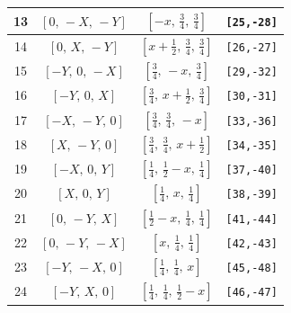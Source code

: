\documentclass[fleqn,8pt]{jsarticle}
\begin{document}
\begin{longtable}{cccc}
13 & $\left[ 0,\, - X,\, - Y \right]$ & $\left[ - x,\, \frac{3}{4},\, \frac{3}{4} \right]$ & {\tt [25,-28]} \\ \hline
14 & $\left[ 0,\, X,\, - Y \right]$ & $\left[ x + \frac{1}{2},\, \frac{3}{4},\, \frac{3}{4} \right]$ & {\tt [26,-27]} \\ \hline
15 & $\left[ - Y,\, 0,\, - X \right]$ & $\left[ \frac{3}{4},\, - x,\, \frac{3}{4} \right]$ & {\tt [29,-32]} \\ \hline
16 & $\left[ - Y,\, 0,\, X \right]$ & $\left[ \frac{3}{4},\, x + \frac{1}{2},\, \frac{3}{4} \right]$ & {\tt [30,-31]} \\ \hline
17 & $\left[ - X,\, - Y,\, 0 \right]$ & $\left[ \frac{3}{4},\, \frac{3}{4},\, - x \right]$ & {\tt [33,-36]} \\ \hline
18 & $\left[ X,\, - Y,\, 0 \right]$ & $\left[ \frac{3}{4},\, \frac{3}{4},\, x + \frac{1}{2} \right]$ & {\tt [34,-35]} \\ \hline
19 & $\left[ - X,\, 0,\, Y \right]$ & $\left[ \frac{1}{4},\, \frac{1}{2} - x,\, \frac{1}{4} \right]$ & {\tt [37,-40]} \\ \hline
20 & $\left[ X,\, 0,\, Y \right]$ & $\left[ \frac{1}{4},\, x,\, \frac{1}{4} \right]$ & {\tt [38,-39]} \\ \hline
21 & $\left[ 0,\, - Y,\, X \right]$ & $\left[ \frac{1}{2} - x,\, \frac{1}{4},\, \frac{1}{4} \right]$ & {\tt [41,-44]} \\ \hline
22 & $\left[ 0,\, - Y,\, - X \right]$ & $\left[ x,\, \frac{1}{4},\, \frac{1}{4} \right]$ & {\tt [42,-43]} \\ \hline
23 & $\left[ - Y,\, - X,\, 0 \right]$ & $\left[ \frac{1}{4},\, \frac{1}{4},\, x \right]$ & {\tt [45,-48]} \\ \hline
24 & $\left[ - Y,\, X,\, 0 \right]$ & $\left[ \frac{1}{4},\, \frac{1}{4},\, \frac{1}{2} - x \right]$ & {\tt [46,-47]} \\
\end{longtable}
\renewcommand{\arraystretch}{1.2}
\end{document}
